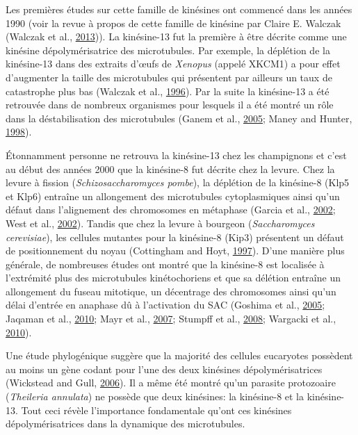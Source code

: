 \documentclass[12pt,a4paper,twoside,openright]{book}
\begin{document}
Les premières études sur cette famille de kinésines ont commencé dans
les années 1990 (voir la revue à propos de cette famille de kinésine par
Claire E. Walczak (Walczak et al.,
\protect\hyperlink{ref-Walczak2013a}{2013})). La kinésine-13 fut la
première à être décrite comme une kinésine dépolymérisatrice des
microtubules. Par exemple, la déplétion de la kinésine-13 dans des
extraits d'œufs de \emph{Xenopus} (appelé XKCM1) a pour effet
d'augmenter la taille des microtubules qui présentent par ailleurs un
taux de catastrophe plus bas (Walczak et al.,
\protect\hyperlink{ref-Walczak1996}{1996}). Par la suite la kinésine-13
a été retrouvée dans de nombreux organismes pour lesquels il a été
montré un rôle dans la déstabilisation des microtubules (Ganem et al.,
\protect\hyperlink{ref-Ganem2005}{2005}; Maney and Hunter,
\protect\hyperlink{ref-Maney1998}{1998}).

Étonnamment personne ne retrouva la kinésine-13 chez les champignons et
c'est au début des années 2000 que la kinésine-8 fut décrite chez la
levure. Chez la levure à fission (\emph{Schizosaccharomyces pombe}), la
déplétion de la kinésine-8 (Klp5 et Klp6) entraîne un allongement des
microtubules cytoplasmiques ainsi qu'un défaut dans l'alignement des
chromosomes en métaphase (Garcia et al.,
\protect\hyperlink{ref-Garcia2002d}{2002}; West et al.,
\protect\hyperlink{ref-West2002}{2002}). Tandis que chez la levure à
bourgeon (\emph{Saccharomyces cerevisiae}), les cellules mutantes pour
la kinésine-8 (Kip3) présentent un défaut de positionnement du noyau
(Cottingham and Hoyt, \protect\hyperlink{ref-Cottingham1997}{1997}).
D'une manière plus générale, de nombreuses études ont montré que la
kinésine-8 est localisée à l'extrémité plus des microtubules
kinétochoriens et que sa délétion entraîne un allongement du fuseau
mitotique, un décentrage des chromosomes ainsi qu'un délai d'entrée en
anaphase dû à l'activation du SAC (Goshima et al.,
\protect\hyperlink{ref-Goshima2005}{2005}; Jaqaman et al.,
\protect\hyperlink{ref-Jaqaman2010}{2010}; Mayr et al.,
\protect\hyperlink{ref-Mayr2007}{2007}; Stumpff et al.,
\protect\hyperlink{ref-Stumpff2008}{2008}; Wargacki et al.,
\protect\hyperlink{ref-Wargacki2010}{2010}).

Une étude phylogénique suggère que la majorité des cellules eucaryotes
possèdent au moins un gène codant pour l'une des deux kinésines
dépolymérisatrices (Wickstead and Gull,
\protect\hyperlink{ref-Wickstead2006}{2006}). Il a même été montré qu'un
parasite protozoaire (\emph{Theileria annulata}) ne possède que deux
kinésines: la kinésine-8 et la kinésine-13. Tout ceci révèle
l'importance fondamentale qu'ont ces kinésines dépolymérisatrices dans
la dynamique des microtubules.
\end{document}
